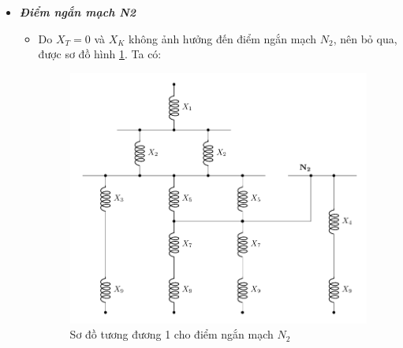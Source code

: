 \documentclass[12pt,a4paper]{article}
\begin{document}
\begin{itemize}
\begin{itemize}
			\item \textbf{\textit{Điểm ngắn mạch N2}}
				\begin{itemize}
					\item Do $X_T = 0 $ và $X_K$ không ảnh hưởng đến điểm ngắn mạch $N_2$, nên bỏ qua, được sơ đồ hình \ref{Fig:sodo-tuongduong-bt1-N2-1}. Ta có:
					\begin{figure}[!h]
						\vspace{-.5cm}
						\begin{center}
							\includegraphics[scale=1]{figure-baitap-nganmach-1-N2-1.pdf} 
							\vspace{-.5cm}
						\end{center}
						\caption{Sơ đồ tương đương 1 cho điểm ngắn mạch $N_2$} \label{Fig:sodo-tuongduong-bt1-N2-1}
					\end{figure}

\end{itemize}
\end{itemize}
\end{itemize}
\end{document}
